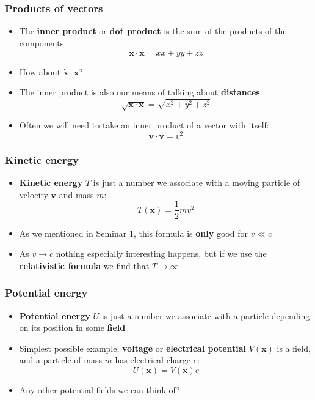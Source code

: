 \documentclass{beamer}
\begin{document}
\begin{frame}
  \frametitle{Products of vectors}
  \begin{itemize}
    \item<1-> The \textbf{inner product} or \textbf{dot product} is the sum of the products of the components
      \begin{equation*}
	\mathbf{x}\cdot\dot{\mathbf{x}}=x\dot{x}+y\dot{y}+z\dot{z}
      \end{equation*}
    \item<2-> How about $\dot{\mathbf{x}}\cdot\ddot{\mathbf{x}}$?
    \item<3-> The inner product is also our means of talking about \textbf{distances}:
      \begin{equation*}
	\sqrt{\mathbf{x}\cdot\mathbf{x}}=\sqrt{x^2+y^2+z^2}	
      \end{equation*}
    \item<4-> Often we will need to take an inner product of a vector with itself:
      \begin{equation*}
	\mathbf{v}\cdot\mathbf{v}=v^2
      \end{equation*}
  \end{itemize}
\end{frame}

\begin{frame}
  \center
  \frametitle{Kinetic energy}
  \begin{itemize}
    \item<1-> \textbf{Kinetic energy} $T$ is just a number we associate with a moving particle of velocity $\mathbf{v}$ and mass $m$:
      \begin{equation*}
	T(\dot{\mathbf{x}})=\frac{1}{2}mv^2
      \end{equation*}
    \item<2-> As we mentioned in Seminar 1, this formula is \textbf{only} good for $v\ll c$
    \item<3-> As $v\to c$ nothing especially interesting happens, but if we use the \textbf{relativistic formula} we find that $T\to\infty$
  \end{itemize}
\end{frame}

\begin{frame}
  \center
  \frametitle{Potential energy}
  \begin{itemize}
    \item<1-> \textbf{Potential energy} $U$ is just a number we associate with a particle depending on its position in some \textbf{field}
    \item<2-> Simplest possible example, \textbf{voltage} or \textbf{electrical potential} $V(\mathbf{x})$ is a field, and a particle of mass $m$ has electrical charge $e$:
      \begin{equation*}
	U(\mathbf{x})=V(\mathbf{x})e
      \end{equation*}
    \item<3-> Any other potential fields we can think of?
  \end{itemize}
\end{frame}
\end{document}
